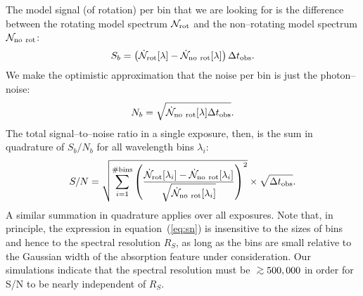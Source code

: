 \documentclass[12pt,preprint]{aastex}
\def\gsim{\;\rlap{\lower 2.5pt
 \hbox{$\sim$}}\raise 1.5pt\hbox{$>$}\;}
\begin{document}
The model signal (of rotation) per bin that we are looking for is the
difference between the rotating model spectrum $\mathcal{N}_{\rm rot}$
and the non--rotating model spectrum $\mathcal{N}_{\rm no~rot}$:
\begin{equation}
S_b = \left(\dot{\mathcal{N}}_{\rm rot}[\lambda] - \dot{\mathcal{N}}_{\rm no~rot}[\lambda]\right) \Delta t_{\rm obs}.
\label{eq:signal}
\end{equation}
We make the optimistic approximation that the noise per bin is just the
photon--noise:
\begin{equation}
N_b = \sqrt{\dot{\mathcal{N}}_{\rm no~rot}[\lambda] \Delta t_{\rm obs}}.
\label{eq:noise}
\end{equation}
The total signal--to--noise ratio in a single exposure, then, is the sum in
quadrature of $S_b/N_b$ for all wavelength bins $\lambda_i$:
\begin{equation}
S/N = \sqrt{\sum_{i = 1}^{\# \rm bins} \left( \frac{\dot{\mathcal{N}}_{\rm rot}[\lambda_i] - \dot{\mathcal{N}}_{\rm no~rot}[\lambda_i]}{\sqrt{\dot{\mathcal{N}}_{\rm no~rot}[\lambda_i]}} \right)^2 } \times \sqrt{\Delta t_{\rm obs}}.
\label{eq:sn}
\end{equation}
A similar summation in quadrature applies over all exposures.
Note that, in principle, the expression in equation~(\ref{eq:sn}) is
insensitive to the sizes of bins and hence to the spectral resolution $R_S$,
as long as the bins are small relative to the Gaussian width of the
absorption feature under consideration.  Our simulations indicate that the
spectral resolution must be $\gsim 500,000$ in order for S/N to be nearly
independent of $R_S$.
\end{document}
